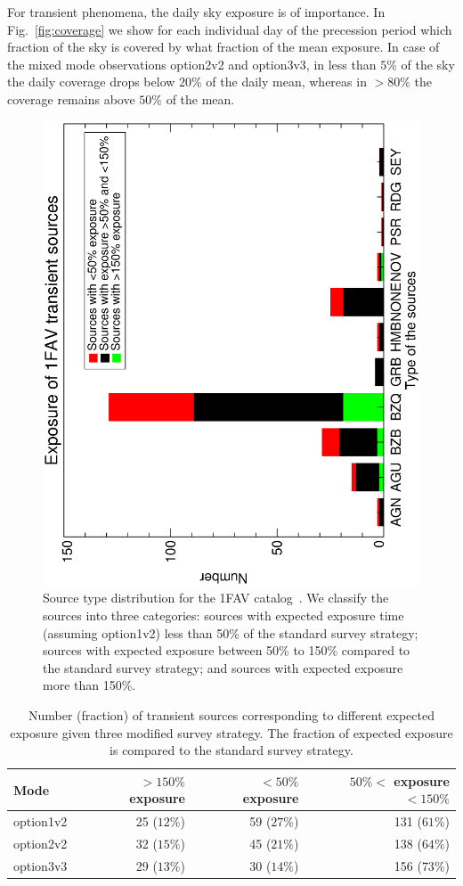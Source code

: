 \documentclass[aps,prd,superscriptaddress,nofootinbib,fixlfloat, 12pt]{revtex4-1}
\begin{document}
For transient phenomena, the daily sky exposure is of importance. In 
Fig.~\ref{fig:coverage} we show for each individual day of the precession
period which fraction of the sky is covered by what fraction of the mean
exposure. In case of the mixed mode observations option2v2 and option3v3, in
less than $5\%$ of the sky the daily coverage drops below $20\%$ of the daily
mean, whereas in $>80\%$ the coverage remains above $50\%$ of the mean.

\begin{figure}[t]
  \begin{center}
    \includegraphics[width=0.5\linewidth, angle=-90]{plots/source_type_hist.ps}
    \vspace{-0.5cm}
  \end{center}
  \caption{Source type distribution for the 1FAV
    catalog~\cite{Fermi-LAT:2013jsa}. We classify the
    sources into three categories: sources with expected
    exposure time (assuming option1v2) less than 50\% of the
    standard survey strategy; sources with expected exposure
    between 50\% to 150\% compared to the standard survey
    strategy; and sources with expected exposure more than
    150\%. }
  \label{fig:transhist}
\end{figure}

\begin{table}[t]
  \begin{tabular}{lcrcrcr}
    \hline
    Mode && $>150\%$ exposure && $<50\%$ exposure && $50\%<$ exposure $<150\%$\\
    \hline
    option1v2 && 25 ($12\%$) && 59 ($27\%$) && 131 ($61\%$) \\
    option2v2 && 32 ($15\%$) && 45 ($21\%$) && 138 ($64\%$) \\
    option3v3 && 29 ($13\%$) && 30 ($14\%$) && 156 ($73\%$)\\
    \hline
  \end{tabular}
  \caption{Number (fraction) of transient sources corresponding to different expected exposure given three modified survey strategy. The fraction of expected exposure is compared to the standard survey strategy. }
  \label{tab:transsource}
\end{table}
\end{document}
